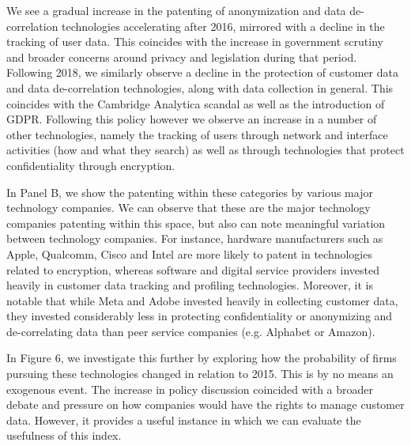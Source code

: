 \documentclass[11pt]{article}
\begin{document}
We see a gradual increase in the patenting of anonymization and data de-correlation technologies accelerating after 2016, mirrored with a decline in the tracking of user data. This coincides with the increase in government scrutiny and broader concerns around privacy and legislation during that period. Following 2018, we similarly observe a decline in the protection of customer data and data de-correlation technologies, along with data collection in general. This coincides with the Cambridge Analytica scandal as well as the introduction of GDPR. Following this policy however we observe an increase in a number of other technologies, namely the tracking of users through network and interface activities (how and what they search) as well as through technologies that protect confidentiality through encryption.

In Panel B, we show the patenting within these categories by various major technology companies. We can observe that these are the major technology companies patenting within this space, but also can note meaningful variation between technology companies. For instance, hardware manufacturers such as Apple, Qualcomm, Cisco and Intel are more likely to patent in technologies related to encryption, whereas software and digital service providers invested heavily in customer data tracking and profiling technologies. Moreover, it is notable that while Meta and Adobe invested heavily in collecting customer data, they invested considerably less in protecting confidentiality or anonymizing and de-correlating data than peer service companies (e.g. Alphabet or Amazon).

In Figure 6, we investigate this further by exploring how the probability of firms pursuing these technologies changed in relation to 2015. This is by no means an exogenous event. The increase in policy discussion coincided with a broader debate and pressure on how companies would have the rights to manage customer data. However, it provides a useful instance in which we can evaluate the usefulness of this index.
\end{document}
